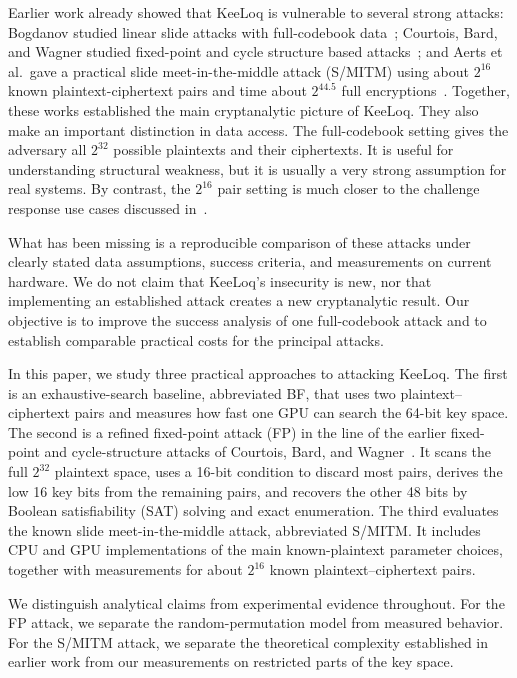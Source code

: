 \documentclass[version=preprint]{iacrcc}
\begin{document}
Earlier work already showed that KeeLoq is vulnerable to several strong attacks:
Bogdanov studied linear slide attacks with full-codebook data~\cite{bogdanov2007linear};
Courtois, Bard, and Wagner studied fixed-point and cycle structure based attacks~\cite{courtois2007algebraic};
and Aerts et al.\ gave a practical slide meet-in-the-middle attack (S/MITM) using about $2^{16}$ known plaintext-ciphertext pairs and time about $2^{44.5}$ full encryptions~\cite{indesteege2008practical}.
Together, these works established the main cryptanalytic picture of KeeLoq.
They also make an important distinction in data access.
The full-codebook setting gives the adversary all $2^{32}$ possible plaintexts and their ciphertexts.
It is useful for understanding structural weakness, but it is usually a very strong assumption for real systems.
By contrast, the $2^{16}$ pair setting is much closer to the challenge response use cases discussed in~\cite{indesteege2008practical}.

What has been missing is a reproducible comparison of these attacks under clearly stated data assumptions, success criteria, and measurements on current hardware.
We do not claim that KeeLoq's insecurity is new, nor that implementing an established attack creates a new cryptanalytic result.
Our objective is to improve the success analysis of one full-codebook attack and to establish comparable practical costs for the principal attacks.

In this paper, we study three practical approaches to attacking KeeLoq.
The first is an exhaustive-search baseline, abbreviated BF, that uses two plaintext--ciphertext pairs and measures how fast one GPU can search the 64-bit key space.
The second is a refined fixed-point attack (FP) in the line of the earlier fixed-point and cycle-structure attacks of Courtois, Bard, and Wagner~\cite{courtois2007algebraic}.
It scans the full $2^{32}$ plaintext space, uses a 16-bit condition to discard most pairs, derives the low 16 key bits from the remaining pairs, and recovers the other 48 bits by Boolean satisfiability (SAT) solving and exact enumeration.
The third evaluates the known slide meet-in-the-middle attack, abbreviated S/MITM.
It includes CPU and GPU implementations of the main known-plaintext parameter choices, together with measurements for about $2^{16}$ known plaintext--ciphertext pairs.

We distinguish analytical claims from experimental evidence throughout.
For the FP attack, we separate the random-permutation model from measured behavior.
For the S/MITM attack, we separate the theoretical complexity established in earlier work from our measurements on restricted parts of the key space.
\end{document}
